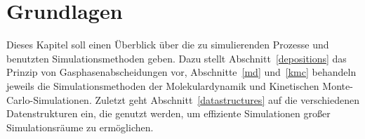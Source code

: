 \chapter{Grundlagen}
\label{theory}

Dieses Kapitel soll einen Überblick über die zu simulierenden Prozesse und benutzten Simulationsmethoden geben.
Dazu stellt Abschnitt~\ref{depositions} das Prinzip von Gasphasenabscheidungen vor, Abschnitte~\ref{md} und~\ref{kmc} behandeln jeweils die Simulationsmethoden der Molekulardynamik und Kinetischen Monte-Carlo-Simulationen.
Zuletzt geht Abschnitt~\ref{datastructures} auf die verschiedenen Datenstrukturen ein, die genutzt werden, um effiziente Simulationen großer Simulationsräume zu ermöglichen.


\clearpage

\clearpage

\clearpage

